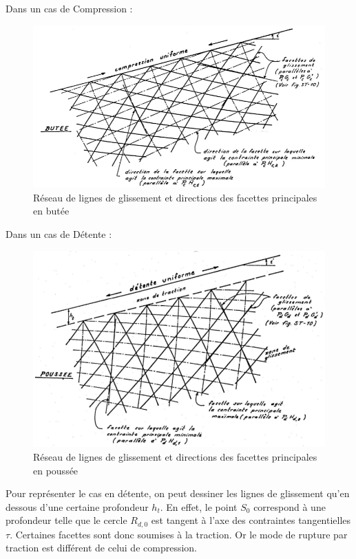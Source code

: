             \begin{multicols}{2}
                Dans un cas de Compression :
                \begin{figure}[h!]
                \includegraphics[scale=0.6]{Holeyman/images/H11.PNG}
                \caption{ Réseau de lignes de glissement et directions des facettes principales en butée }
                \end{figure}
            \vfill\null\columnbreak
                Dans un cas de Détente :
                \begin{figure}[h!]
                \includegraphics[scale=0.5]{Holeyman/images/H12.PNG}
                \caption{Réseau de lignes de glissement et directions des facettes principales en poussée}
                \end{figure}
            \end{multicols}
            
            Pour représenter le cas en détente, on peut dessiner les lignes de glissement qu'en dessous d'une certaine profondeur $h_t$. En effet, le point $S_0$ correspond à une profondeur telle que le cercle $R_{d,0}$ est tangent à l'axe des contraintes tangentielles $\tau$. Certaines facettes sont donc soumises à la traction. Or le mode de rupture par traction est différent de celui de compression. 
            
